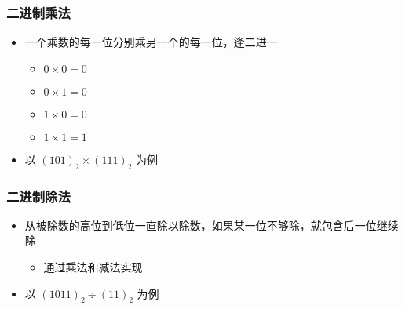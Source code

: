 \begin{frame}[fragile]
    \frametitle{二进制乘法}

    \begin{itemize}
        \item 一个乘数的每一位分别乘另一个的每一位，逢二进一
        \begin{itemize}
            \item $0 \times 0 = 0$
            \item $0 \times 1 = 0$
            \item $1 \times 0 = 0$
            \item $1 \times 1 = 1$
        \end{itemize}
        \item<2-> 以 $(101)_2 \times (111)_2$ 为例

    \end{itemize}

\end{frame}

\begin{frame}[fragile]
    \frametitle{二进制除法}

    \begin{itemize}
        \item 从被除数的高位到低位一直除以除数，如果某一位不够除，就包含后一位继续除
        \begin{itemize}
            \item 通过乘法和减法实现
        \end{itemize}
        \item<2-> 以 $(1011)_2 \div (11)_2$ 为例

    \end{itemize}

\end{frame}


